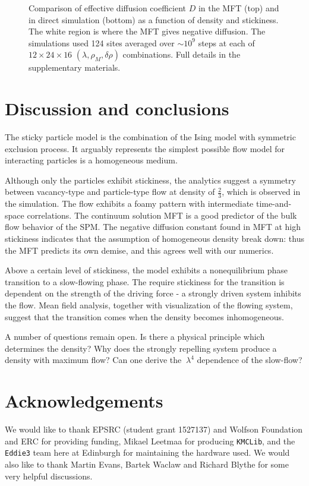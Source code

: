 \documentclass[
reprint, amsmath,amssymb,
]{revtex4-1}
\begin{document}
\begin{figure}[h!]
\begin{center}
\begin{tabular}{c}
    \end{tabular}
\end{center}
\caption{\label{fig:diffCoef}
Comparison of effective diffusion coefficient $D$ in the MFT (top) and in direct simulation (bottom) as a function of density and stickiness.
The white region is where the MFT gives negative diffusion. The simulations used 124 sites averaged over $\sim 10^9$ steps at each of $12 \times 24 \times 16 $ $(\lambda, \rho_M, \delta \rho)$ combinations.  
Full details in the supplementary materials.}
    \vspace{-2em}
\end{figure}




\section{Discussion and conclusions}

The sticky particle model is the combination of the Ising model with
symmetric exclusion process.  It arguably represents the simplest
possible flow model for interacting particles is a homogeneous medium.

Although only the particles exhibit
stickiness, the analytics suggest a symmetry between vacancy-type and
particle-type flow at density of $\frac{2}{3}$, which is observed in
the simulation.  The flow exhibits a foamy pattern with intermediate
time-and-space correlations.  The continuum solution MFT is a good
predictor of the bulk flow behavior of the SPM.  The negative
diffusion constant found in MFT at high stickiness indicates that the
assumption of homogeneous density break down: thus the MFT predicts
its own demise, and this agrees well with our numerics.

Above a certain level of stickiness, the model exhibits a
nonequilibrium phase transition to a slow-flowing phase.  The require
stickiness for the transition is dependent on the strength of the
driving force - a strongly driven system inhibits the flow.  Mean field
analysis, together with visualization of the flowing system, suggest
that the transition comes when the density becomes inhomogeneous.

A number of questions remain open. Is there a physical principle which
determines the density?  Why does the strongly repelling system
produce a density with maximum flow?  Can one derive the $~\lambda^4$
dependence of the slow-flow?

\section*{Acknowledgements}
We would like to thank EPSRC (student grant 1527137) and Wolfson
Foundation and ERC for providing funding, Mikael Leetmaa for producing
\texttt{KMCLib}, and the \texttt{Eddie3} team here at Edinburgh for
maintaining the hardware used.  We would also like to thank Martin
Evans, Bartek Waclaw and Richard Blythe for some very helpful
discussions.


\end{document}
